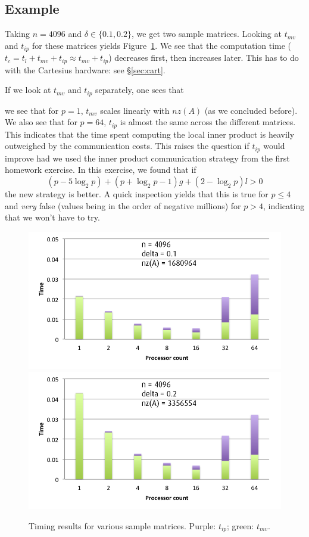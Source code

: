 \documentclass[11pt]{amsart}
\theoremstyle{definition}
\begin{document}
\subsection{Example}
Taking $n = 4096$ and $\delta \in \{0.1, 0.2\}$, we get two sample matrices. Looking at $t_{mv}$ and $t_{ip}$ for these matrices yields Figure~\ref{fig:samples}. We see that the computation time ($t_c = t_l + t_{mv} + t_{ip} \approx t_{mv} + t_{ip}$) decreases first, then increases later. This has to do with the Cartesius hardware: see \S \ref{sec:cart}.

If we look at $t_{mv}$ and $t_{ip}$ separately, one sees that


we see that for $p=1$, $t_{mv}$ scales linearly with $nz(A)$ (as we concluded before). We also see that for $p=64$, $t_{ip}$ is almost the same across the different matrices. This indicates that the time spent computing the local inner product is heavily outweighed by the communication costs. This raises the question if $t_{ip}$ would improve had we used the inner product communication strategy from the first homework exercise. \cite{TODOHUISWERK} In this exercise, we found that if
\[
  (p - 5\log_2 p) + (p + \log_2 p - 1)g + (2-\log_2 p)l > 0
\]
the new strategy is better. A quick inspection yields that this is true for $p \leq 4$ and \emph{very} false (values being in the order of negative millions) for $p > 4$, indicating that we won't have to try.

\begin{figure}
  \includegraphics[width=0.48\linewidth]{n4096d0_1mvip.png}
  \includegraphics[width=0.48\linewidth]{n4096d0_2mvip.png}
  \caption{Timing results for various sample matrices. Purple: $t_{ip}$; green: $t_{mv}$.}
  \label{fig:samples}
\end{figure}
\end{document}
